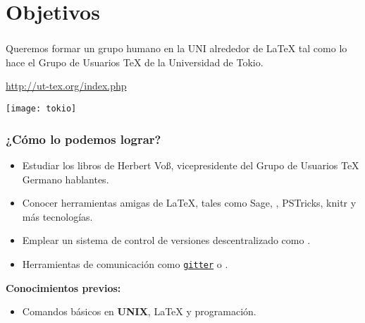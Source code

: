 \section{Objetivos}

\begin{frame}
\frametitle{\insertsection}
Queremos formar un grupo humano en la UNI alrededor de \LaTeX{} tal como lo hace el Grupo de Usuarios \TeX{} de la Universidad de Tokio.

{\centering
\url{http://ut-tex.org/index.php}
\par}

	\begin{center}
	\texttt{[image: tokio]}
	\end{center}
\end{frame}

\begin{frame}[fragile]
\frametitle{¿Cómo lo podemos lograr?}
\begin{itemize}
	\item Estudiar los libros de Herbert Vo\ss, vicepresidente del Grupo de Usuarios \TeX{} Germano hablantes.
	\item Conocer herramientas amigas de \LaTeX{}, tales como Sage, \arara, PSTricks, knitr y más tecnologías.
	\item Emplear un sistema de control de versiones descentralizado como \git.
	\item Herramientas de comunicación como \href{https://gitter.im/}{\texttt{gitter}} o \href{https://hangouts.google.com/}{\hangouts}.
\end{itemize}
\textbf{Conocimientos previos:}
\begin{itemize}
	\item Comandos básicos en \textbf{UNIX}, \LaTeX{} y programación.
\end{itemize}
\end{frame}
